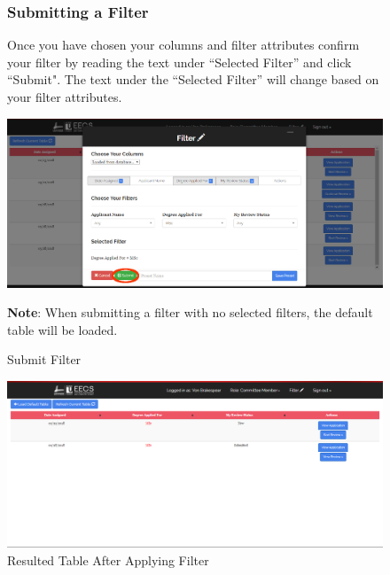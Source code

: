 \documentclass[fontsize=12pt,paper=letter,twoside]{scrartcl}
\begin{document}
\clearpage 
\begin{figure}[!htb]
\subsubsection{Submitting a Filter}
Once you have chosen your columns and filter attributes confirm your filter by reading the text under ``Selected Filter'' and click ``Submit". The text under the ``Selected Filter'' will change based on your filter attributes.
\begin{center}
\includegraphics[width=.99\textwidth]{images/submit_filter.png}
\end{center}
\caption{Submit Filter}
\textbf{Note}: When submitting a filter with no selected filters, the default table will be loaded.
\label{fig:submit_filter}
\end{figure}

\begin{figure}[!htb]
\begin{center}
\includegraphics[width=.99\textwidth]{images/example_filter_table.png}
\end{center}
\caption{Resulted Table After Applying Filter}
\label{fig:resulted_table}
\end{figure}

\clearpage
\end{document}
